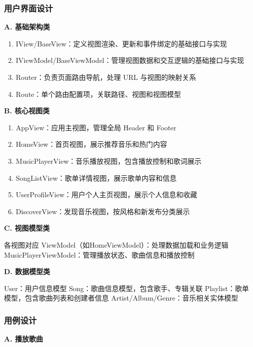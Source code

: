 \documentclass{base}
\numberwithin{figure}{section} %
\begin{document}
\subsubsection{用户界面设计}

\textbf{A. 基础架构类}

\begin{enumerate}
    \item IView/BaseView：定义视图渲染、更新和事件绑定的基础接口与实现
    \item IViewModel/BaseViewModel：管理视图数据和交互逻辑的基础接口与实现
    \item Router：负责页面路由导航，处理 URL 与视图的映射关系
    \item Route：单个路由配置项，关联路径、视图和视图模型
\end{enumerate}

\textbf{B. 核心视图类}

\begin{enumerate}
    \item AppView：应用主视图，管理全局 Header 和 Footer
    \item HomeView：首页视图，展示推荐音乐和热门内容
    \item MusicPlayerView：音乐播放视图，包含播放控制和歌词展示
    \item SongListView：歌单详情视图，展示歌单内容和信息
    \item UserProfileView：用户个人主页视图，展示个人信息和收藏
    \item DiscoverView：发现音乐视图，按风格和新发布分类展示
\end{enumerate}

\textbf{C. 视图模型类}

各视图对应 ViewModel（如HomeViewModel）：处理数据加载和业务逻辑
MusicPlayerViewModel：管理播放状态、歌曲信息和播放控制

\textbf{D. 数据模型类}

User：用户信息模型
Song：歌曲信息模型，包含歌手、专辑关联
Playlist：歌单模型，包含歌曲列表和创建者信息
Artist/Album/Genre：音乐相关实体模型

\subsubsection{用例设计}

\textbf{A. 播放歌曲}
\end{document}
